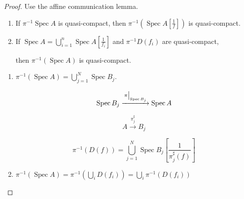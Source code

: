 \documentclass{article}
\theoremstyle{definition}
\begin{document}
    \begin{proof}
        Use the affine communication lemma.

        \begin{enumerate}[label=\arabic*)]
            \item If \(\pi ^{-1} \operatorname{Spec} A\) is quasi-compact, then \(\pi ^{-1} (\operatorname{Spec} A \left[ \frac{1}{f} \right] )\) is quasi-compact.
            \item If \(\operatorname{Spec} A = \bigcup_{i=1}^n \operatorname{Spec} A \left[ \frac{1}{f_i} \right] \) and \(\pi ^{-1} D(f_i)\) are quasi-compact,
            
            then \(\pi ^{-1} (\operatorname{Spec} A)\) is quasi-compact.  
        \end{enumerate} 

        \begin{enumerate}[label=\arabic*)]
            \item \(\pi ^{-1} (\operatorname{Spec} A) = \bigcup_{j=1}^N \operatorname{Spec} B_j\).
            
            \[
                \operatorname{Spec} B_j \xrightarrow{\eval{\pi}_{\operatorname{Spec} B_j}} \operatorname{Spec} A
            \]

            \[
                A \xrightarrow{\pi_j^\sharp} B_j
            \]

            \[
                \pi ^{-1} (D(f)) = \bigcup_{j=1}^N \operatorname{Spec} B_j \left[ \frac{1}{\pi_j^\sharp (f)} \right]
            \]

            \item \(\pi ^{-1} (\operatorname{Spec} A) = \pi ^{-1} \left( \bigcup_{i} D(f_i) \right) = \bigcup_{i} \pi ^{-1} (D(f_i))\)

        \end{enumerate} 

    \end{proof}
\end{document}
